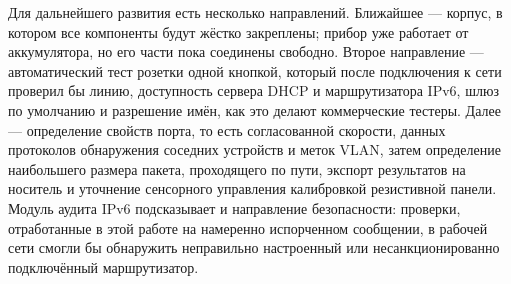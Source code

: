 Для дальнейшего развития есть несколько направлений. Ближайшее — корпус, в котором все компоненты будут жёстко закреплены; прибор уже работает от аккумулятора, но его части пока соединены свободно. Второе направление — автоматический тест розетки одной кнопкой, который после подключения к сети проверил бы линию, доступность сервера DHCP и маршрутизатора IPv6, шлюз по умолчанию и разрешение имён, как это делают коммерческие тестеры. Далее — определение свойств порта, то есть согласованной скорости, данных протоколов обнаружения соседних устройств и меток VLAN, затем определение наибольшего размера пакета, проходящего по пути, экспорт результатов на носитель и уточнение сенсорного управления калибровкой резистивной панели. Модуль аудита IPv6 подсказывает и направление безопасности: проверки, отработанные в этой работе на намеренно испорченном сообщении, в рабочей сети смогли бы обнаружить неправильно настроенный или несанкционированно подключённый маршрутизатор.
